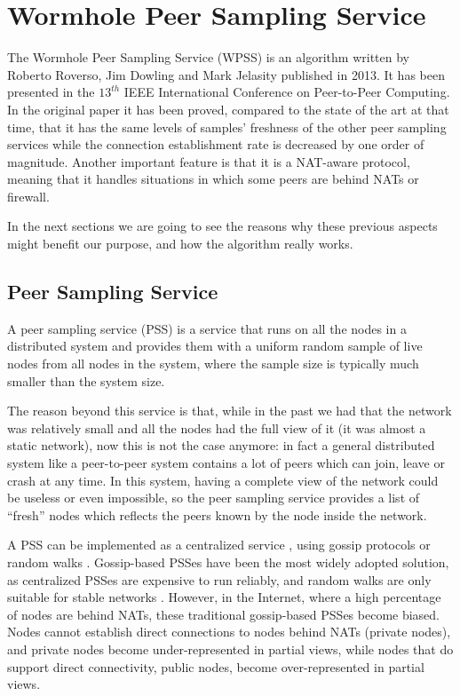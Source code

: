 \chapter{Wormhole Peer Sampling Service}
\label{cha:wormhole}
The Wormhole Peer Sampling Service (WPSS)\cite{wormhole} is an algorithm written by Roberto Roverso, Jim Dowling and Mark Jelasity published in 2013. It has been presented in the $13^{th}$ IEEE International Conference on Peer-to-Peer Computing. In the original paper it has been proved, compared to the state of the art at that time, that it has the same levels of samples' freshness  of the other peer sampling services while the connection establishment rate is decreased by one order of magnitude. Another important feature is that it is a NAT-aware protocol, meaning that it handles situations in which some peers are behind NATs or firewall.

In the next sections we are going to see the reasons why these previous aspects might benefit our purpose, and how the algorithm really works.

\section{Peer Sampling Service}
\label{sec:pss}
A peer sampling service (PSS) is a service that runs on all the nodes in a distributed system and provides them with a uniform random sample of live nodes from all nodes in the system, where the sample size is typically much smaller than the system size. 

The reason beyond this service is that, while in the past we had that the network was relatively small and all the nodes had the full view of it (it was almost a static network), now this is not the case anymore: in fact a general distributed system like a peer-to-peer system contains a lot of peers which can join, leave or crash at any time. In this system, having a complete view of the network could be useless or even impossible, so the peer sampling service provides a list of ``fresh'' nodes which reflects the peers known by the node inside the network.

A PSS can be implemented as a centralized service \cite{spotify}, using gossip protocols \cite{gossip_protocol} or random walks \cite{rw}. Gossip-based PSSes have been the most widely adopted solution, as centralized PSSes are expensive to run reliably, and random walks are only suitable for stable networks \cite{rw}. However, in the Internet, where a high percentage of nodes are behind NATs, these traditional gossip-based PSSes become biased. Nodes cannot establish direct connections to nodes behind NATs (private nodes), and private nodes become under-represented in partial views, while nodes that do support direct connectivity, public nodes, become over-represented in partial views\cite{gozar}. 

